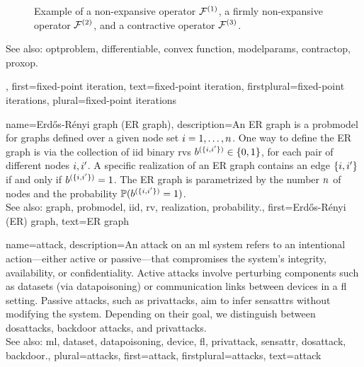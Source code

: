 {{\begin{figure}[H]
\begin{center}
			\end{center} 
			\caption{Example of a non-expansive operator $\mathcal{F}^{(1)}$, a firmly non-expansive operator $\mathcal{F}^{(2)}$, and 
				a contractive operator $\mathcal{F}^{(3)}$. \label{fig_examples_nonexp_dict}}
		\end{figure} 
		See also: \gls{optproblem}, \gls{differentiable}, \gls{convex} \gls{function}, \gls{modelparams}, \gls{contractop}, \gls{proxop}.},
	first={fixed-point iteration},
	text={fixed-point iteration},
	firstplural={fixed-point iterations}, 
	plural={fixed-point iterations}
}


{name={Erd\H{o}s-R\'enyi graph (ER graph)},
	description={An ER  \gls{graph} is a \gls{probmodel} for \glspl{graph} defined over 
		a given node set $i=1,\ldots,n$. One way to define the ER \gls{graph} is 
		via the collection of \gls{iid} binary \glspl{rv} $b^{(\{i,i'\})} \in \{0,1\}$, 
		for each pair of different nodes $i, i'$. A specific \gls{realization}  
		of an ER \gls{graph} contains an edge $\{i,i'\}$ if and only if 
		$b^{(\{i,i'\})}=1$. The ER \gls{graph} is parametrized by the 
		number $n$ of nodes and the \gls{probability} $\mathbb{P}({b^{(\{i,i'\})}=1})$. 
		\\
		See also: \gls{graph}, \gls{probmodel}, \gls{iid}, \gls{rv}, \gls{realization}, \gls{probability}.},
	first={Erd\H{o}s-R\'enyi (ER) graph},
	text={ER graph}
}

{name={attack},  
	description={An attack on an \gls{ml} system refers to an intentional action—either 
		active or passive—that compromises the system's integrity, availability, or confidentiality. 
		Active attacks involve perturbing components such as \glspl{dataset} (via \gls{datapoisoning}) 
		or communication links between \glspl{device} in a \gls{fl} setting. Passive attacks, 
		such as \glspl{privattack}, aim to infer \glspl{sensattr} without modifying the system. 
		Depending on their goal, we distinguish between \glspl{dosattack}, \gls{backdoor} attacks, and \glspl{privattack}.
		\\
		See also: \gls{ml}, \gls{dataset}, \gls{datapoisoning}, \gls{device}, \gls{fl}, \gls{privattack}, \gls{sensattr}, \gls{dosattack}, \gls{backdoor}.},
	plural={attacks}, 
	first={attack},
	firstplural={attacks},
	text={attack}
}


